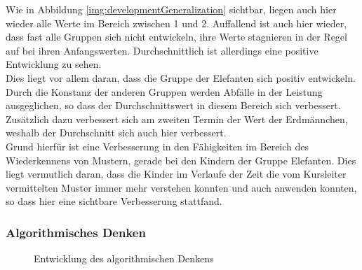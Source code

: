 Wie in Abbildung \ref{img:developmentGeneralization} sichtbar, liegen auch hier wieder alle Werte im Bereich zwischen 1 und 2. Auffallend ist auch hier wieder, dass fast alle Gruppen sich nicht entwickeln, ihre Werte stagnieren in der Regel auf bei ihren Anfangswerten. Durchschnittlich ist allerdings eine positive Entwicklung zu sehen.\\
Dies liegt vor allem daran, dass die Gruppe der Elefanten sich positiv entwickeln. Durch die Konstanz der anderen Gruppen werden Abfälle in der Leistung ausgeglichen, so dass der Durchschnittswert in diesem Bereich sich verbessert. Zusätzlich dazu verbessert sich am zweiten Termin der Wert der Erdmännchen, weshalb der Durchschnitt sich auch hier verbessert.\\
Grund hierfür ist eine Verbesserung in den Fähigkeiten im Bereich des Wiederkennens von Mustern, gerade bei den Kindern der Gruppe Elefanten. Dies liegt vermutlich daran, dass die Kinder im Verlaufe der Zeit die vom Kursleiter vermittelten Muster immer mehr verstehen konnten und auch anwenden konnten, so dass hier eine sichtbare Verbesserung stattfand. 


\subsubsection{Algorithmisches Denken}
\begin{figure}[H]
	\centering
	\caption{Entwicklung des algorithmischen Denkens}
\end{figure}

